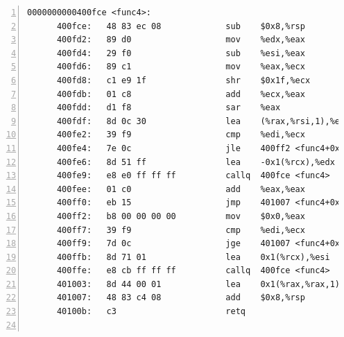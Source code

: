 \documentclass{article}
\begin{document}
\begin{lstlisting}[title = bomb的反汇编代码及部分注释, xleftmargin = 2em,xrightmargin = 2em, aboveskip = 1em, numbers = left, basicstyle=\scriptsize\ttfamily, numberstyle=\scriptsize]
    0000000000400fce <func4>:
      400fce:	48 83 ec 08          	sub    $0x8,%rsp					; %rsp -= 0x8;
      400fd2:	89 d0                	mov    %edx,%eax					; %eax = %rdx;
      400fd4:	29 f0                	sub    %esi,%eax					; %eax -= %esi;
      400fd6:	89 c1                	mov    %eax,%ecx					; %ecx = %eax;
      400fd8:	c1 e9 1f             	shr    $0x1f,%ecx					; %ecx >>=(H) 0x1f;
      400fdb:	01 c8                	add    %ecx,%eax					; %eax += %ecx;
      400fdd:	d1 f8                	sar    %eax							; %eax >>= 1;
      400fdf:	8d 0c 30             	lea    (%rax,%rsi,1),%ecx			; %ecx = %rax + %rsi;
      400fe2:	39 f9                	cmp    %edi,%ecx					; if (%ecx <= %edi)
      400fe4:	7e 0c                	jle    400ff2 <func4+0x24>			;	  goto #436;
      400fe6:	8d 51 ff             	lea    -0x1(%rcx),%edx				; %edx = %rcx - 1;
      400fe9:	e8 e0 ff ff ff       	callq  400fce <func4>				; func4(%rdi, %rsi, %rdx);
      400fee:	01 c0                	add    %eax,%eax					; %eax += %eax;
      400ff0:	eb 15                	jmp    401007 <func4+0x39>			; goto #442;
      400ff2:	b8 00 00 00 00       	mov    $0x0,%eax					; %eax = 0;
      400ff7:	39 f9                	cmp    %edi,%ecx					; if (%ecx >= %edi)
      400ff9:	7d 0c                	jge    401007 <func4+0x39>			;	  goto #442;
      400ffb:	8d 71 01             	lea    0x1(%rcx),%esi				; %esi = %rcx + 1;
      400ffe:	e8 cb ff ff ff       	callq  400fce <func4>				; func4(%rdi, %rsi, %rdx);
      401003:	8d 44 00 01          	lea    0x1(%rax,%rax,1),%eax		; %eax = 2 * %rax + 1;
      401007:	48 83 c4 08          	add    $0x8,%rsp					; %rsp += 8;
      40100b:	c3                   	retq								; return %eax;
    

\end{lstlisting}
\end{document}
